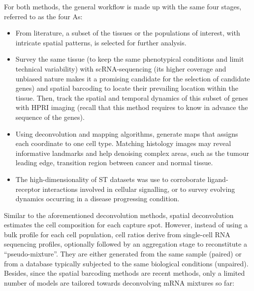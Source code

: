 For both methods, the general workflow is made up with the same four stages, referred to as the four As:
\begin{itemize}
    \item[Adopt] From literature, a subset of the tissues or the populations of interest, with intricate spatial patterns, is selected for further analysis. 
    \item[Assay] Survey the same tissue (to keep the same phenotypical conditions and limit technical variability) with scRNA-sequencing (its higher coverage and unbiased nature makes it a promising candidate for the selection of candidate genes) and spatial barcoding to locate their prevailing location within the tissue. Then, track the spatial and temporal dynamics of this subset of genes with HPRI imaging (recall that this method requires to know in advance the sequence of the genes).
    \item[Assemble] Using deconvolution and mapping algorithms, generate maps that assigns each coordinate to one cell type. Matching histology images may reveal informative landmarks and help denoising complex areas, such as the tumour leading edge, transition region between cancer and normal tissue. 
    \item[Analyse] The high-dimensionality of ST datasets was use to corroborate ligand-receptor interactions involved in cellular signalling, or to survey evolving dynamics occurring in a disease progressing condition.
\end{itemize}


Similar to the aforementioned deconvolution methods, spatial deconvolution estimates the cell composition for each capture spot. However, instead of using a bulk profile for each cell population, cell ratios derive from single-cell RNA sequencing profiles, optionally followed by an aggregation stage to reconstitute a \enquote{pseudo-mixture}. They are either generated from the same sample (paired) or from a database typically subjected to the same biological conditions (unpaired). Besides, since the spatial barcoding methods are recent methods, only a limited number of models are tailored towards deconvolving mRNA mixtures so far:

